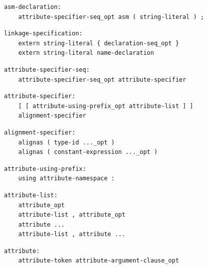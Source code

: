 \noindent\textbf{\texttt{}}\par
\begin{lstlisting}
asm-declaration:
    attribute-specifier-seq_opt asm ( string-literal ) ;
\end{lstlisting}

\noindent\textbf{\texttt{}}\par
\begin{lstlisting}
linkage-specification:
    extern string-literal { declaration-seq_opt }
    extern string-literal name-declaration
\end{lstlisting}

\noindent\textbf{\texttt{}}\par
\begin{lstlisting}
attribute-specifier-seq:
    attribute-specifier-seq_opt attribute-specifier
\end{lstlisting}

\noindent\textbf{\texttt{}}\par
\begin{lstlisting}
attribute-specifier:
    [ [ attribute-using-prefix_opt attribute-list ] ]
    alignment-specifier
\end{lstlisting}

\noindent\textbf{\texttt{}}\par
\begin{lstlisting}
alignment-specifier:
    alignas ( type-id ..._opt )
    alignas ( constant-expression ..._opt )
\end{lstlisting}

\noindent\textbf{\texttt{}}\par
\begin{lstlisting}
attribute-using-prefix:
    using attribute-namespace :
\end{lstlisting}

\noindent\textbf{\texttt{}}\par
\begin{lstlisting}
attribute-list:
    attribute_opt
    attribute-list , attribute_opt
    attribute ...
    attribute-list , attribute ...
\end{lstlisting}

\noindent\textbf{\texttt{}}\par
\begin{lstlisting}
attribute:
    attribute-token attribute-argument-clause_opt
\end{lstlisting}

